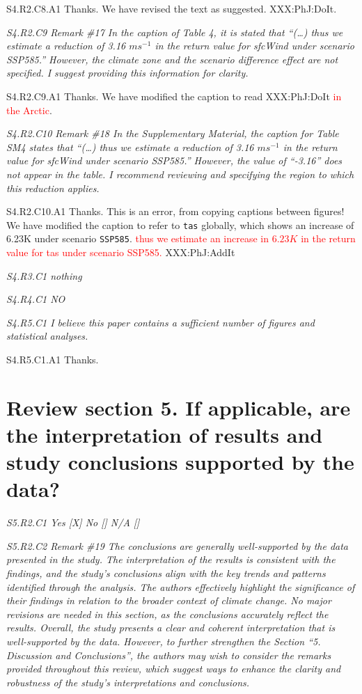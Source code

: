 \documentclass[a4paper,10pt]{article}
\newcommand{\ed}[1]{\textcolor{red}{#1}}
\providecommand{\TA}{\texttt{tas}\xspace}
\providecommand{\SH}{\texttt{SSP585}\xspace}
\begin{document}
	S4.R2.C8.A1 Thanks. We have revised the text as suggested. XXX:PhJ:DoIt.

	\emph{S4.R2.C9 Remark \#17 In the caption of Table 4, it is stated that “(…) thus we estimate a reduction of 3.16 $ms^{-1}$ in the return value for sfcWind under scenario SSP585.” However, the climate zone and the scenario difference effect are not specified. I suggest providing this information for clarity.}

	S4.R2.C9.A1 Thanks. We have modified the caption to read XXX:PhJ:DoIt \ed{in the Arctic}.

	\emph{S4.R2.C10 Remark \#18 In the Supplementary Material, the caption for Table SM4 states that “(…) thus we estimate a reduction of 3.16 $ms^{-1}$ in the return value for sfcWind under scenario SSP585.” However, the value of “-3.16” does not appear in the table. I recommend reviewing and specifying the region to which this reduction applies.}

	S4.R2.C10.A1 Thanks. This is an error, from copying captions between figures! We have modified the caption to refer to \TA globally, which shows an increase of 6.23K under scenario \SH. \ed{thus we estimate an increase in $6.23K$ in the return value for tas under scenario SSP585.} XXX:PhJ:AddIt

	\emph{S4.R3.C1 nothing}

	\emph{S4.R4.C1 NO}

	\emph{S4.R5.C1 I believe this paper contains a sufficient number of figures and statistical analyses.}
	
	S4.R5.C1.A1 Thanks.

	\section*{Review section 5. If applicable, are the interpretation of results and study conclusions supported by the data?}

	\emph{S5.R2.C1 Yes [X] No [] N/A []}

	\emph{S5.R2.C2 Remark \#19 The conclusions are generally well-supported by the data presented in the study. The interpretation of the results is consistent with the findings, and the study’s conclusions align with the key trends and patterns identified through the analysis. The authors effectively highlight the significance of their findings in relation to the broader context of climate change. No major revisions are needed in this section, as the conclusions accurately reflect the results. Overall, the study presents a clear and coherent interpretation that is well-supported by the data. However, to further strengthen the Section “5. Discussion and Conclusions”, the authors may wish to consider the remarks provided throughout this review, which suggest ways to enhance the clarity and robustness of the study’s interpretations and conclusions.}
\end{document}
